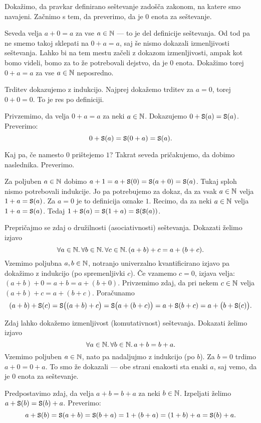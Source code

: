 Dokažimo, da pravkar definirano seštevanje zadošča zakonom, na katere smo navajeni. Začnimo s tem, da preverimo, da je $0$ enota za seštevanje.

Seveda velja $a + 0 = a$ za vse $a \in \mathbb{N}$ --- to je del definicije seštevanja. Od tod pa ne smemo takoj sklepati na $0 + a = a$, saj še nismo dokazali izmenljivosti seštevanja. Lahko bi na tem mestu začeli z dokazom izmenljivosti, ampak kot bomo videli, bomo za to že potrebovali dejstvo, da je $0$ enota. Dokažimo torej $0 + a = a$ za vse $a \in \mathbb{N}$ neposredno.

Trditev dokazujemo z indukcijo. Najprej dokažemo trditev za $a = 0$, torej $0 + 0 = 0$. To je res po definiciji.

Privzemimo, da velja $0 + a = a$ za neki $a \in \mathbb{N}$. Dokazujemo $0 + \mathtt{S}(a) = \mathtt{S}(a)$. Preverimo:
\[0 + \mathtt{S}(a) = \mathtt{S}(0 + a) = \mathtt{S}(a).\]

Kaj pa, če namesto $0$ prištejemo $1$? Takrat seveda pričakujemo, da dobimo naslednika. Preverimo.

Za poljuben $a \in \mathbb{N}$ dobimo $a + 1 = a + \mathtt{S}(0) = \mathtt{S}(a + 0) = \mathtt{S}(a)$. Tukaj sploh nismo potrebovali indukcije. Jo pa potrebujemo za dokaz, da za vsak $a \in \mathbb{N}$ velja $1 + a = \mathtt{S}(a)$. Za $a = 0$ je to definicija oznake $1$. Recimo, da za neki $a \in \mathbb{N}$ velja $1 + a = \mathtt{S}(a)$. Tedaj $1 + \mathtt{S}(a) = \mathtt{S}(1 + a) = \mathtt{S}(\mathtt{S}(a))$.

Prepričajmo se zdaj o družilnosti (asociativnosti) seštevanja. Dokazati želimo izjavo
\[\forall a \in \mathbb{N} .\,\forall b \in \mathbb{N} .\,\forall c \in \mathbb{N} .\,{(a + b) + c = a + (b + c)}.\]
Vzemimo poljubna $a, b \in \mathbb{N}$, notranjo univerzalno kvantificirano izjavo pa dokažimo z indukcijo (po spremenljivki $c$). Če vzamemo $c = 0$, izjava velja: $(a + b) + 0 = a + b = a + (b + 0)$. Privzemimo zdaj, da pri nekem $c \in \mathbb{N}$ velja $(a + b) + c = a + (b + c)$. Poračunamo
\[(a + b) + \mathtt{S}(c) = \mathtt{S}\big((a + b) + c\big) = \mathtt{S}\big(a + (b + c)\big) = a + \mathtt{S}(b + c) = a + \big(b + \mathtt{S}(c)\big).\]

Zdaj lahko dokažemo izmenljivost (komutativnost) seštevanja. Dokazati želimo izjavo
\[\forall a \in \mathbb{N} .\,\forall b \in \mathbb{N} .\,{a + b = b + a}.\]
Vzemimo poljuben $a \in \mathbb{N}$, nato pa nadaljujmo z indukcijo (po $b$). Za $b = 0$ trdimo $a + 0 = 0 + a$. To smo že dokazali --- obe strani enakosti sta enaki $a$, saj vemo, da je $0$ enota za seštevanje.

Predpostavimo zdaj, da velja $a + b = b + a$ za neki $b \in \mathbb{N}$. Izpeljati želimo $a + \mathtt{S}(b) = \mathtt{S}(b) + a$. Preverimo:
\[a + \mathtt{S}(b) = \mathtt{S}(a + b) = \mathtt{S}(b + a) = 1 + (b + a) = (1 + b) + a = \mathtt{S}(b) + a.\]

